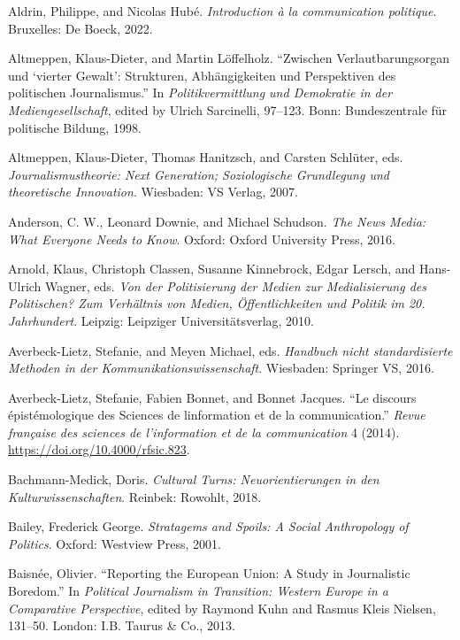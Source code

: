 \documentclass{tufte-handout}
\begin{document}
\begin{hangparas}{.25in}{1} 



Aldrin, Philippe, and Nicolas Hubé. \emph{Introduction à la
communication politique}. Bruxelles: De Boeck, 2022.

Altmeppen, Klaus-Dieter, and Martin Löffelholz. ``Zwischen
Verlautbarungsorgan und `vierter Gewalt': Strukturen, Abhängigkeiten und
Perspektiven des politischen Journalismus.'' In \emph{Politikvermittlung
und Demokratie in der Mediengesellschaft}, edited by Ulrich Sarcinelli,
97--123. Bonn: Bundeszentrale für politische Bildung, 1998.

Altmeppen, Klaus-Dieter, Thomas Hanitzsch, and Carsten Schlüter, eds.
\emph{Journalismustheorie: Next Generation; Soziologische Grundlegung
und theoretische Innovation}. Wiesbaden: VS Verlag, 2007.

Anderson, C. W., Leonard Downie, and Michael Schudson. \emph{The News
Media: What Everyone Needs to Know}. Oxford: Oxford University Press,
2016.

Arnold, Klaus, Christoph Classen, Susanne Kinnebrock, Edgar Lersch, and
Hans-Ulrich Wagner, eds. \emph{Von der Politisierung der Medien zur
Medialisierung des Politischen? Zum Verhältnis von Medien,
Öffentlichkeiten und Politik im 20. Jahrhundert}. Leipzig: Leipziger
Universitätsverlag, 2010.

Averbeck-Lietz, Stefanie, and Meyen Michael, eds. \emph{Handbuch nicht
standardisierte Methoden in der Kommunikationswissenschaft}. Wiesbaden:
Springer VS, 2016.

Averbeck-Lietz, Stefanie, Fabien Bonnet, and Bonnet Jacques. ``Le
discours épistémologique des Sciences de l\textquotesingle information
et de la communication.'' \emph{Revue française des sciences de
l'information et de la communication} 4 (2014).
\url{https://doi.org/10.4000/rfsic.823}.

Bachmann-Medick, Doris. \emph{Cultural Turns: Neuorientierungen in den
Kulturwissenschaften}. Reinbek: Rowohlt, 2018.

Bailey, Frederick George. \emph{Stratagems and Spoils: A Social
Anthropology of Politics}. Oxford: Westview Press, 2001.

Baisnée, Olivier. ``Reporting the European Union: A Study in
Journalistic Boredom.'' In \emph{Political Journalism in Transition:
Western Europe in a Comparative Perspective}, edited by Raymond Kuhn and
Rasmus Kleis Nielsen, 131--50. London: I.B. Taurus \& Co., 2013.


\end{hangparas}
\end{document}
